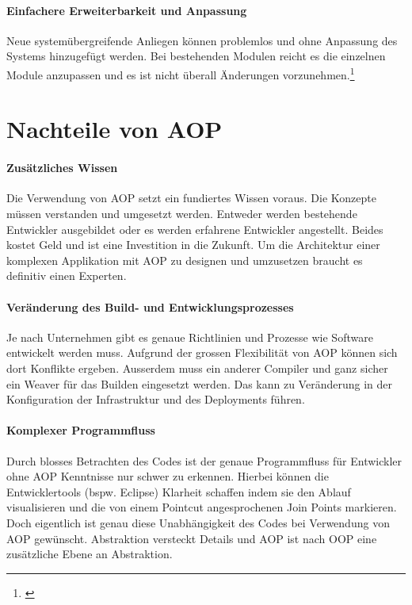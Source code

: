 \paragraph{Einfachere Erweiterbarkeit und Anpassung}
Neue systemübergreifende Anliegen können problemlos und ohne Anpassung des Systems hinzugefügt werden. Bei bestehenden Modulen reicht es die einzelnen Module anzupassen und es ist nicht überall Änderungen vorzunehmen.\footnote{\cite{aop:benefits}}
\section{Nachteile von AOP}
\paragraph{Zusätzliches Wissen}
Die Verwendung von AOP setzt ein fundiertes Wissen voraus. Die Konzepte müssen verstanden und umgesetzt werden. Entweder werden bestehende Entwickler ausgebildet oder es werden erfahrene Entwickler angestellt. Beides kostet Geld und ist eine Investition in die Zukunft. Um die Architektur einer komplexen Applikation mit AOP zu designen und umzusetzen braucht es definitiv einen Experten.
\paragraph{Veränderung des Build- und Entwicklungsprozesses}
Je nach Unternehmen gibt es genaue Richtlinien und Prozesse wie Software entwickelt werden muss. Aufgrund der grossen Flexibilität von AOP können sich dort Konflikte ergeben. Ausserdem muss ein anderer Compiler und ganz sicher ein Weaver für das Builden eingesetzt werden. Das kann zu Veränderung in der Konfiguration der Infrastruktur und des Deployments führen.
\paragraph{Komplexer Programmfluss}
Durch blosses Betrachten des Codes ist der genaue Programmfluss für Entwickler ohne AOP Kenntnisse nur schwer zu erkennen. Hierbei können die Entwicklertools (bspw. Eclipse) Klarheit schaffen indem sie den Ablauf visualisieren und die von einem Pointcut angesprochenen Join Points markieren. Doch eigentlich ist genau diese Unabhängigkeit des Codes bei Verwendung von AOP gewünscht. Abstraktion versteckt Details und AOP ist nach OOP eine zusätzliche Ebene an Abstraktion.
